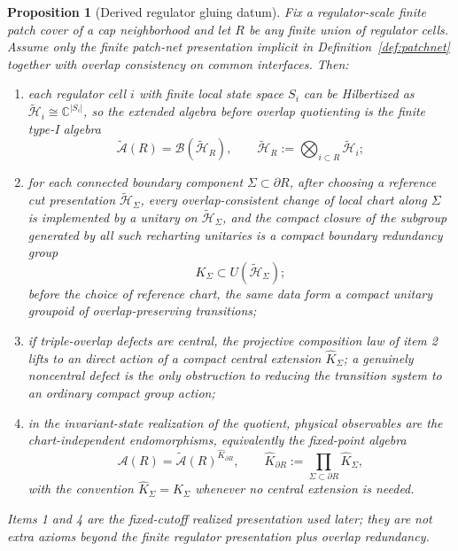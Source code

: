 \documentclass[11pt]{article}
\newtheorem{proposition}[theorem]{Proposition}
\begin{document}
\begin{proposition}[Derived regulator gluing datum]\label{prop:regulatedrealization}
Fix a regulator-scale finite patch cover of a cap neighborhood and let \(R\) be any finite union of regulator cells. Assume only the finite patch-net presentation implicit in Definition~\ref{def:patchnet} together with overlap consistency on common interfaces. Then:
\begin{enumerate}[leftmargin=2em]
\item each regulator cell \(i\) with finite local state space \(S_i\) can be Hilbertized as \(\tilde{\mathcal H}_i\cong \mathbb C^{|S_i|}\), so the extended algebra before overlap quotienting is the finite type-I algebra
\[
\widetilde{\mathcal A}(R)=\mathcal B(\tilde{\mathcal H}_R),
\qquad
\tilde{\mathcal H}_R:=\bigotimes_{i\subset R}\tilde{\mathcal H}_i;
\]
\item for each connected boundary component \(\Sigma\subset\partial R\), after choosing a reference cut presentation \(\tilde{\mathcal H}_\Sigma\), every overlap-consistent change of local chart along \(\Sigma\) is implemented by a unitary on \(\tilde{\mathcal H}_\Sigma\), and the compact closure of the subgroup generated by all such recharting unitaries is a compact boundary redundancy group
\[
K_\Sigma\subset U(\tilde{\mathcal H}_\Sigma);
\]
before the choice of reference chart, the same data form a compact unitary groupoid of overlap-preserving transitions;
\item if triple-overlap defects are central, the projective composition law of item 2 lifts to an direct action of a compact central extension \(\widehat K_\Sigma\); a genuinely noncentral defect is the only obstruction to reducing the transition system to an ordinary compact group action;
\item in the invariant-state realization of the quotient, physical observables are the chart-independent endomorphisms, equivalently the fixed-point algebra
\[
\mathcal A(R)=\widetilde{\mathcal A}(R)^{\widehat K_{\partial R}},
\qquad
\widehat K_{\partial R}:=\prod_{\Sigma\subset\partial R}\widehat K_\Sigma,
\]
\noindent with the convention \(\widehat K_\Sigma=K_\Sigma\) whenever no central extension is needed.
\end{enumerate}
Items 1 and 4 are the fixed-cutoff realized presentation used later; they are not extra axioms beyond the finite regulator presentation plus overlap redundancy.
\end{proposition}
\end{document}
